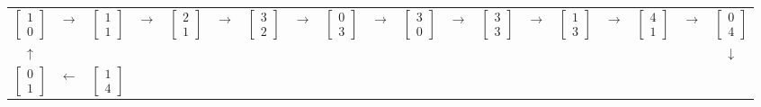 \documentclass[a4paper, 12pt, reqno]{amsart}
\begin{document}
			\setlength\tabcolsep{0.12cm}  
			\begin{tabular}{*{19}{c}}
				$\begin{bmatrix}
					1 \\
					0
				\end{bmatrix}$ & 
				$\rightarrow$ &
				$\begin{bmatrix}
					1 \\
					1
				\end{bmatrix}$ &
				$\rightarrow$ &
				$\begin{bmatrix}
					2 \\
					1
				\end{bmatrix}$ &
				$\rightarrow$ &
				$\begin{bmatrix}
					3 \\
					2
				\end{bmatrix}$ &
				$\rightarrow$ &
				$\begin{bmatrix}
					0 \\
					3
				\end{bmatrix}$ &
				$\rightarrow$ &
				$\begin{bmatrix}
					3 \\
					0
				\end{bmatrix}$ &
				$\rightarrow$ &
				$\begin{bmatrix}
					3 \\
					3
				\end{bmatrix}$ &
				$\rightarrow$ &
				$\begin{bmatrix}
					1 \\
					3
				\end{bmatrix}$ &
				$\rightarrow$ &
				$\begin{bmatrix}
					4 \\
					1
				\end{bmatrix}$ &
				$\rightarrow$ &
				$\begin{bmatrix}
					0 \\
					4
				\end{bmatrix}$ \\
				$\uparrow$ &&&&&&&&&&&&&&&&&& $\downarrow$ \\
				$\begin{bmatrix}
					0 \\
					1
				\end{bmatrix}$ & 
				$\leftarrow$ &
				$\begin{bmatrix}
					1 \\
					4
				\end{bmatrix}$ &

\end{tabular}
\end{document}
